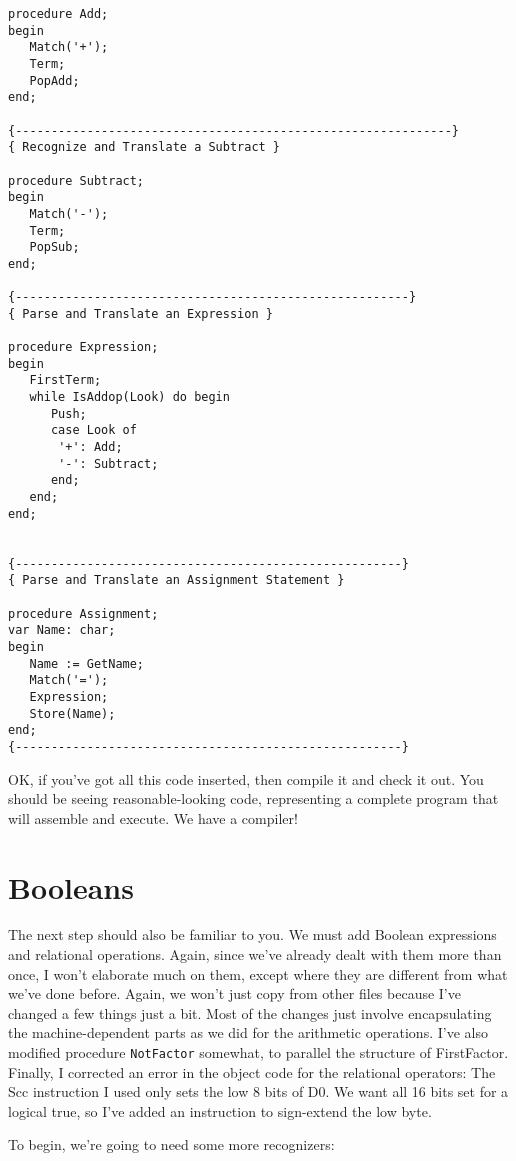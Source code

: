 \begin{verbatim}
procedure Add;
begin
   Match('+');
   Term;
   PopAdd;
end;

{-------------------------------------------------------------}
{ Recognize and Translate a Subtract }

procedure Subtract;
begin
   Match('-');
   Term;
   PopSub;
end;

{-------------------------------------------------------}
{ Parse and Translate an Expression }

procedure Expression;
begin
   FirstTerm;
   while IsAddop(Look) do begin
      Push;
      case Look of
       '+': Add;
       '-': Subtract;
      end;
   end;
end;


{------------------------------------------------------}
{ Parse and Translate an Assignment Statement }

procedure Assignment;
var Name: char;
begin
   Name := GetName;
   Match('=');
   Expression;
   Store(Name);
end;
{------------------------------------------------------}
\end{verbatim}

OK, if you've  got  all  this  code inserted, then compile it and check  it out. You should  be  seeing  reasonable-looking  code, representing a complete program that will  assemble  and execute. We have a compiler!

\section{Booleans}

The next step should also  be  familiar  to  you. We  must add Boolean  expressions  and relational operations. Again, since we've already dealt with them more than once, I  won't elaborate much on them, except  where  they  are  different from what we've done before. Again, we won't just copy from other  files because I've changed a few things just a bit. Most  of  the changes just involve encapsulating the machine-dependent parts as  we  did for the   arithmetic  operations. I've  also  modified   procedure {\tt NotFactor}  somewhat, to  parallel  the structure of FirstFactor. Finally, I  corrected  an  error  in  the  object code  for  the relational operators:  The Scc instruction I used  only  sets the low 8 bits of D0. We want all 16 bits set for a logical true, so I've added an instruction to sign-extend the low byte.

To begin, we're going to need some more recognizers:

